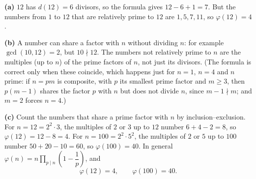 \textbf{(a)} $12$ has $d(12)=6$ divisors, so the formula gives $12-6+1=7$. But the numbers from $1$ to $12$ that are relatively prime to $12$ are $1,5,7,11$, so $\varphi(12)=4$.

\textbf{(b)} A number can share a factor with $n$ without dividing $n$: for example $\gcd(10,12)=2$, but $10\nmid12$. The numbers not relatively prime to $n$ are the multiples (up to $n$) of the prime factors of $n$, not just its divisors. (The formula is correct only when these coincide, which happens just for $n=1$, $n=4$ and $n$ prime: if $n=pm$ is composite, with $p$ its smallest prime factor and $m\ge3$, then $p(m-1)$ shares the factor $p$ with $n$ but does not divide $n$, since $m-1\nmid m$; and $m=2$ forces $n=4$.)

\textbf{(c)} Count the numbers that share a prime factor with $n$ by inclusion--exclusion. For $n=12=2^2\cdot3$, the multiples of $2$ or $3$ up to $12$ number $6+4-2=8$, so $\varphi(12)=12-8=4$. For $n=100=2^2\cdot5^2$, the multiples of $2$ or $5$ up to $100$ number $50+20-10=60$, so $\varphi(100)=40$. In general $\varphi(n)=n\prod_{p\mid n}\left(1-\dfrac1p\right)$, and
\[\boxed{\varphi(12)=4,\qquad\varphi(100)=40}.\]
